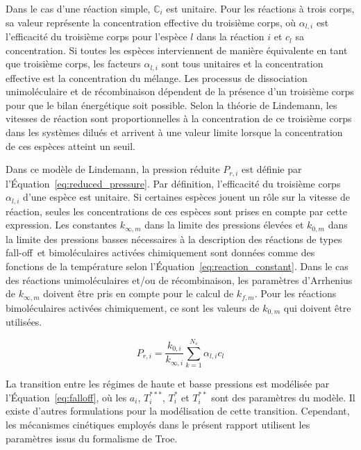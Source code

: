 Dans le cas d'une réaction simple, $\mathbb{C}_{i}$ est unitaire. Pour les réactions à trois corps, sa valeur représente la concentration effective du troisième corps, où $\alpha_{l,i}$ est l'efficacité du troisième corps pour l'espèce $l$ dans la réaction $i$ et $c_{l}$ sa concentration. Si toutes les espèces interviennent de manière équivalente en tant que troisième corps, les facteurs $\alpha_{l,i}$ sont tous unitaires et la concentration effective est la concentration du mélange.  Les processus de dissociation unimoléculaire et de récombinaison dépendent de la présence d'un troisième corps pour que le bilan énergétique soit possible. Selon la théorie de Lindemann, les vitesses de réaction sont proportionnelles à la concentration de ce troisième corps dans les systèmes dilués et arrivent à une valeur limite lorsque la concentration de ces espèces atteint un seuil.

Dans ce modèle de Lindemann, la pression réduite $P_{r,i}$ est définie par l'Équation~\ref{eq:reduced_pressure}. Par définition, l'efficacité du troisième corps $\alpha_{l,i}$ d'une espèce est unitaire. Si certaines espèces jouent un rôle sur la vitesse de réaction, seules les concentrations de ces espèces sont prises en compte par cette expression. Les constantes $k_{\infty,m}$ dans la limite des pressions élevées et $k_{0,m}$ dans la limite des pressions basses nécessaires à la description des réactions de types \og{}fall-off\fg{} et bimoléculaires activées chimiquement sont données comme des fonctions de la température selon l'Équation~\ref{eq:reaction_constant}. Dans le cas des réactions unimoléculaires et/ou de récombinaison, les paramètres d'Arrhenius de $k_{\infty,m}$ doivent être pris en compte pour le calcul de $k_{f,m}$. Pour les réactions bimoléculaires activées chimiquement, ce sont les valeurs de $k_{0,m}$ qui doivent être utilisées.

\begin{equation}
  P_{r,i}=\frac{k_{0,i}}{k_{\infty,i}}\sum_{k=1}^{N_{s}}\alpha_{l,i}c_{l}
  \label{eq:reduced_pressure}
\end{equation}

La transition entre les régimes de haute et basse pressions est modélisée par l'Équation~\ref{eq:falloff}, où les $a_{i}$, $T_{i}^{***}$, $T_{i}^{*}$ et $T_{i}^{**}$ sont des paramètres du modèle. Il existe d'autres formulations pour la modélisation de cette transition. Cependant, les mécanismes cinétiques employés dans le présent rapport utilisent les paramètres issus du formalisme de Troe.


